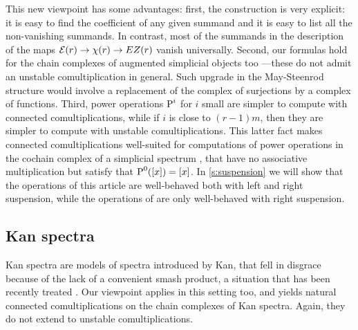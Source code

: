 This new viewpoint has some advantages: first, the construction is very explicit: it is easy to find the coefficient of any given summand and it is easy to list all the non-vanishing summands. In contrast, most of the summands in the description of the maps $\mathcal{E}(r)\to \chi(r)\to EZ(r)$ vanish universally. Second, our formulas hold for the chain complexes of augmented simplicial objects too ---these do not admit an unstable comultiplication in general. Such upgrade in the May-Steenrod structure would involve a replacement of the complex of surjections by a complex of functions. Third, power operations $\operatorname{P}^i$ for $i$ small are simpler to compute with connected comultiplications, while if $i$ is close to $(r-1)m$, then they are simpler to compute with unstable comultiplications. This latter fact makes connected comultiplications well-suited for computations of power operations in the cochain complex of a simplicial spectrum \cite{Gill2020}, that have no associative multiplication but satisfy that $\operatorname{P}^0([x])=[x]$. In \cref{s:suspension} we will show that the operations of this article are well-behaved both with left and right suspension, while the operations of \cite{medina2021may_st} are only well-behaved with right suspension.

\subsection*{Kan spectra} Kan spectra \cite{Kan1963} are models of spectra introduced by Kan, that fell in disgrace because of the lack of a convenient smash product, a situation that has been recently treated \cite{CKP2023}. Our viewpoint applies in this setting too, and yields natural connected comultiplications on the chain complexes of Kan spectra. Again, they do not extend to unstable comultiplications.



